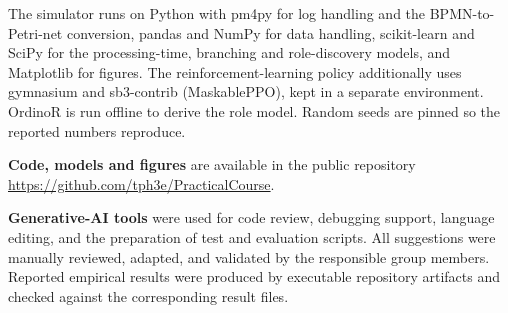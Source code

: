 The simulator runs on Python with pm4py for log handling and the BPMN-to-Petri-net
conversion, pandas and NumPy for data handling, scikit-learn and SciPy for the
processing-time, branching and role-discovery models, and Matplotlib for figures. The
reinforcement-learning policy additionally uses gymnasium and sb3-contrib (MaskablePPO),
kept in a separate environment. OrdinoR is run offline to derive the role model. Random
seeds are pinned so the reported numbers reproduce. 

\textbf{Code, models and figures} are available in
the public repository \url{https://github.com/tph3e/PracticalCourse}.

\textbf{Generative-AI tools} were used for code review, debugging support, language
editing, and the preparation of test and evaluation scripts. All suggestions
were manually reviewed, adapted, and validated by the responsible group
members. Reported empirical results were produced by executable repository
artifacts and checked against the corresponding result files.